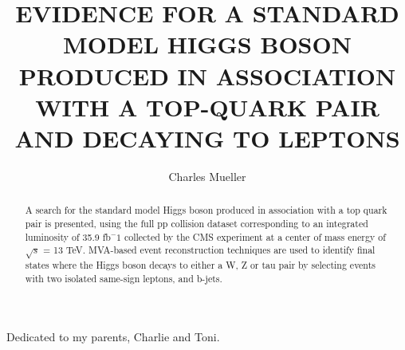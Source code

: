\documentclass[final,numrefs,sort&compress,noinfo]{nddiss2e}
\begin{document}
\frontmatter         %

\title{EVIDENCE FOR A STANDARD MODEL HIGGS BOSON PRODUCED IN ASSOCIATION WITH A TOP-QUARK PAIR AND DECAYING TO LEPTONS}
\author{Charles Mueller}           %

\maketitle           %

\makecopyright



\begin{abstract}
A search for the standard model Higgs boson produced in association with a top quark pair is presented, using the full pp collision
dataset corresponding to an integrated luminosity of 35.9 fb$^-1$ collected by the CMS experiment at a center of mass energy of $\sqrt{s}$ = 13 TeV.
MVA-based event reconstruction techniques are used to identify final states where the Higgs boson decays to either a W, Z or tau pair by
selecting events with two isolated same-sign leptons, and b-jets.
\end{abstract}


\begin{dedication}
Dedicated to my parents, Charlie and Toni.
\end{dedication}
\end{document}
